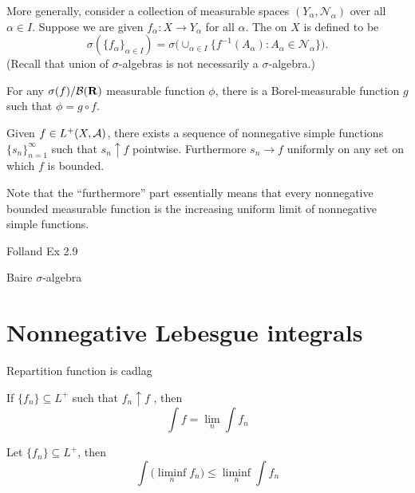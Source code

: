 More generally, consider a collection of measurable spaces $(Y_\alpha,\mathcal{N}_\alpha)$ over all $\alpha \in I$. Suppose we are given $f_\alpha\colon X \to Y_\alpha$ for all $\alpha$. The  on $X$ is defined to be 
\[
    \sigma(\{f_\alpha\}_{\alpha\in I}) = \sigma\bigl(\cup_{\alpha \in I} \{f^{-1}(A_\alpha):A_\alpha\in \mathcal{N}_\alpha\}\bigr).
\] (Recall that union of $\sigma$-algebras is not necessarily a $\sigma$-algebra.)

\begin{prop}
    For any $\sigma(f)/\mathcal{B}(\mathbf{R})$ measurable function $\phi$, there is a Borel-measurable function $g$ such that $\phi = g \circ f$.
\end{prop}

\begin{namedthm}
    Given $f \in L^+(X,\mathcal{A})$, there exists a sequence of nonnegative simple functions $\{s_n\}_{n=1}^\infty$ such that $s_n \uparrow f$ pointwise. Furthermore $s_n \to f$ uniformly on any set on which $f$ is bounded.
\end{namedthm}

Note that the ``furthermore'' part essentially means that every nonnegative bounded measurable function is the increasing uniform limit of nonnegative simple functions.

Folland Ex 2.9

Baire $\sigma$-algebra

\section{Nonnegative Lebesgue integrals}

Repartition function is cadlag


\begin{namedthm} \label{thm:MCT}
    If $\{f_n\} \subseteq L^+$ such that $f_n \uparrow f$ , then \[
        \int f = \lim_n \int f_n
    \]
\end{namedthm}
\begin{namedthm} \label{thm:Fatou}
    Let $\{f_n\}\subseteq L^+$, then \[
        \int \bigl(\liminf_n f_n\bigr) \leq \liminf_n \int f_n
    \]
\end{namedthm}

